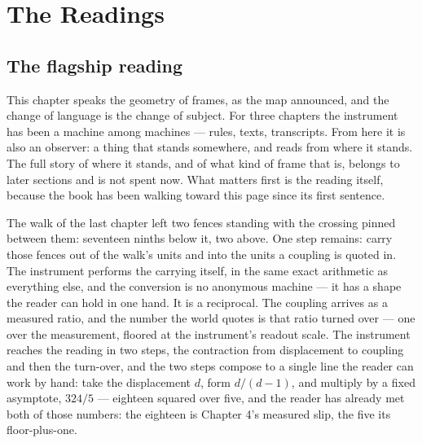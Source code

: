 \chapter{The Readings}

\section{The flagship reading}

This chapter speaks the geometry of frames, as the map announced, and the change of
language is the change of subject. For three chapters the instrument has been a
machine among machines --- rules, texts, transcripts. From here it is also an
observer: a thing that stands somewhere, and reads from where it stands. The full
story of where it stands, and of what kind of frame that is, belongs to later
sections and is not spent now. What matters first is the reading itself, because the
book has been walking toward this page since its first sentence.

The walk of the last chapter left two fences standing with the crossing pinned
between them: seventeen ninths below it, two above. One step remains: carry those
fences out of the walk's units and into the units a coupling is quoted in. The
instrument performs the carrying itself, in the same exact arithmetic as everything
else, and the conversion is no anonymous machine --- it has a shape the reader can
hold in one hand. It is a reciprocal. The coupling arrives as a measured ratio, and
the number the world quotes is that ratio turned over --- one over the measurement,
floored at the instrument's readout scale. The instrument reaches the reading in two
steps, the contraction from displacement to coupling and then the turn-over, and the
two steps compose to a single line the reader can work by hand: take the
displacement $d$, form $d/(d-1)$, and multiply by a fixed asymptote, $324/5$ ---
eighteen squared over five, and the reader has already met both of those numbers:
the eighteen is Chapter 4's measured slip, the five its floor-plus-one.

